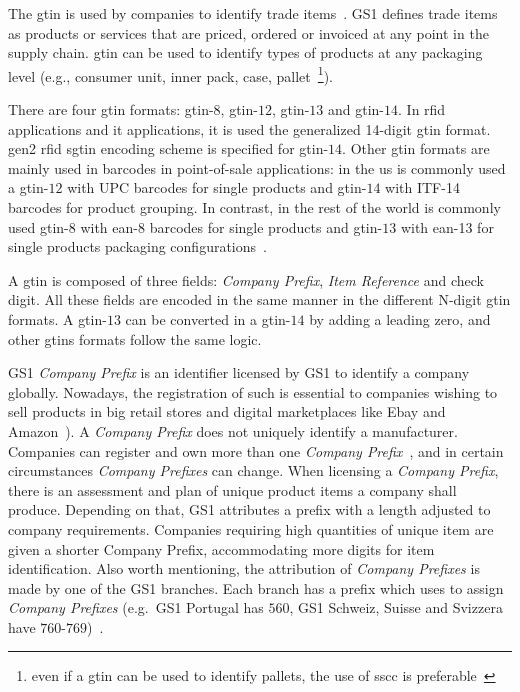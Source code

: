 The \ac{gtin} is used by companies to identify trade items~\cite{GS1GTINExecutive, GS1GTINManagement}. 
GS1 defines trade items as products or services that are priced, ordered or invoiced at any point in the supply chain.
\ac{gtin} can be used to identify types of products at any packaging level (e.g., consumer unit, inner pack, case, pallet~\footnote{even if a \ac{gtin} can be used to identify pallets, the use of \ac{sscc} is preferable~\cite{GS1KeysImplementation}}).

There are four \ac{gtin} formats: \ac{gtin}-$8$, \ac{gtin}-$12$, \ac{gtin}-$13$ and \ac{gtin}-$14$. In \ac{rfid} applications and \ac{it} applications, it is used the generalized 14-digit \ac{gtin} format. \ac{gen2} \ac{rfid} \ac{sgtin} encoding scheme is specified for \ac{gtin}-$14$.
Other \ac{gtin} formats are mainly used in barcodes in point-of-sale applications: in the \ac{us} is commonly used a \ac{gtin}-$12$ with UPC barcodes for single products and \ac{gtin}-$14$ with ITF-14 barcodes for product grouping. In contrast, in the rest of the world is commonly used \ac{gtin}-$8$ with \ac{ean}-8 barcodes for single products and \ac{gtin}-$13$ with \ac{ean}-13 for single products packaging configurations~\cite{BarcodeGS1General,GS1BarcodeChart}.

A \ac{gtin} is composed of three fields: \emph{Company Prefix}, \emph{Item Reference} and check digit. All these fields are encoded in the same manner in the different N-digit \ac{gtin} formats. A \ac{gtin}-$13$ can be converted in a \ac{gtin}-$14$ by adding a leading zero, and other \acp{gtin} formats follow the same logic.

GS1 \emph{Company Prefix} is an identifier licensed by GS1 to identify a company globally. 
Nowadays, the registration of such is essential to companies wishing to sell products in big retail stores and digital marketplaces like Ebay and Amazon~\cite{ListingRequirementsProduct}).
A \emph{Company Prefix} does not uniquely identify a manufacturer. Companies can register and own more than one \emph{Company Prefix}~\cite{GS1EPCglobalArchitecture}, and in certain circumstances \emph{Company Prefixes} can change.
When licensing a \emph{Company Prefix}, there is an assessment and plan of unique product items a company shall produce. 
Depending on that, GS1 attributes a prefix with a length adjusted to company requirements. 
Companies requiring high quantities of unique item are given a shorter Company Prefix, accommodating more digits for item identification.
Also worth mentioning, the attribution of \emph{Company Prefixes} is made by one of the GS1 branches. Each branch has a prefix which uses to assign \emph{Company Prefixes} (e.g.\ GS1 Portugal has $560$, GS1 Schweiz, Suisse and Svizzera have $760$-$769$)~\cite{anonymousGS1CompanyPrefix2014}.

